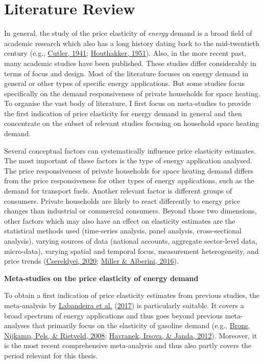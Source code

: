 \documentclass[12pt,twoside]{reedthesis}
\begin{document}
\hypertarget{review}{%
\section{Literature Review}\label{review}}

In general, the study of the price elasticity of \emph{energy} demand is a broad field of academic research which also has a long history dating back to the mid-twentieth century (e.g., \protect\hyperlink{ref-cutler41}{Cutler, 1941}; \protect\hyperlink{ref-houthakker51}{Houthakker, 1951}). Also, in the more recent past, many academic studies have been published. These studies differ considerably in terms of focus and design. Most of the literature focuses on energy demand in general or other types of specific energy applications. But some studies focus specifically on the demand responsiveness of private households for space heating. To organise the vast body of literature, I first focus on meta-studies to provide the first indication of price elasticity for energy demand in general and then concentrate on the subset of relevant studies focusing on household space heating demand.

Several conceptual factors can systematically influence price elasticity estimates. The most important of these factors is the type of energy application analysed. The price responsiveness of private households for space heating demand differs from the price responsiveness for other types of energy applications, such as the demand for transport fuels. Another relevant factor is different groups of consumers. Private households are likely to react differently to energy price changes than industrial or commercial consumers. Beyond those two dimensions, other factors which may also have an effect on elasticity estimates are the statistical methods used (time-series analysis, panel analysis, cross-sectional analysis), varying sources of data (national accounts, aggregate sector-level data, micro-data), varying spatial and temporal focus, measurement heterogeneity, and price trends (\protect\hyperlink{ref-csereklyei20}{Csereklyei, 2020}; \protect\hyperlink{ref-miller_alberini16}{Miller \& Alberini, 2016}).

\textbf{Meta-studies on the price elasticity of energy demand}

To obtain a first indication of price elasticity estimates from previous studies, the meta-analysis by \protect\hyperlink{ref-labandeira_etal17}{Labandeira et al.} (\protect\hyperlink{ref-labandeira_etal17}{2017}) is particularly suitable. It covers a broad spectrum of energy applications and thus goes beyond previous meta-analyses that primarily focus on the elasticity of gasoline demand (e.g., \protect\hyperlink{ref-brons_etal08}{Brons, Nijkamp, Pels, \& Rietveld, 2008}; \protect\hyperlink{ref-havranek_etal12}{Havranek, Irsova, \& Janda, 2012}). Moreover, it is the most recent comprehensive meta-analysis and thus also partly covers the period relevant for this thesis.
\end{document}
